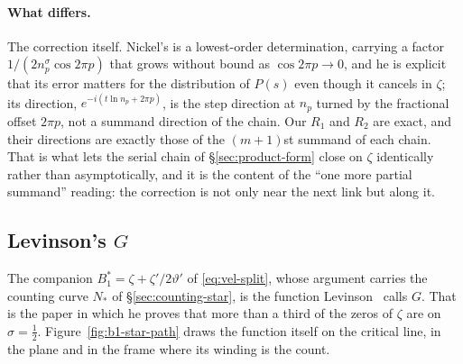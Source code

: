 \documentclass[11pt]{article}
\theoremstyle{definition}
\begin{document}
\paragraph{What differs.} The correction itself. Nickel's is a lowest-order
determination, carrying a factor $1/(2n_p^{\sigma}\cos 2\pi p)$ that grows
without bound as $\cos2\pi p\to0$, and he is explicit that its error matters
for the distribution of $P(s)$ even though it cancels in $\zeta$; its
direction, $e^{-i(t\ln n_p+2\pi p)}$, is the step direction at $n_p$ turned
by the fractional offset $2\pi p$, not a summand direction of the chain. Our
$R_{1}$ and $R_{2}$ are exact, and their directions are exactly those of
the $(m+1)$st summand of each chain. That is what lets the serial chain of
\S\ref{sec:product-form} close on $\zeta$ identically rather than
asymptotically, and it is the content of the ``one more partial summand''
reading: the correction is not only near the next link but along it.

\subsection{Levinson's \texorpdfstring{$G$}{G}}\label{sec:levinson}

The companion $B_1^{\ast}=\zeta+\zeta'/2\vartheta'$ of \eqref{eq:vel-split},
whose argument carries the counting curve $N_{\ast}$ of
\S\ref{sec:counting-star}, is the function Levinson~\cite{Levinson1974} calls
$G$. That is the paper in which he proves that more than a third of the zeros
of $\zeta$ are on $\sigma=\tfrac12$. Figure~\ref{fig:b1-star-path} draws the
function itself on the critical line, in the plane and in the frame where its
winding is the count.
\end{document}
